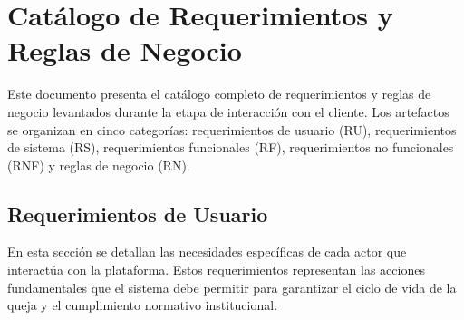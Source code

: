 \documentclass[12pt, oneside, letterpaper]{book}
\begin{document}
\section{Catálogo de Requerimientos y Reglas de Negocio}

Este documento presenta el catálogo completo de requerimientos y reglas de negocio
levantados durante la etapa de interacción con el cliente. Los artefactos se
organizan en cinco categorías: requerimientos de usuario (RU), requerimientos de
sistema (RS), requerimientos funcionales (RF), requerimientos no funcionales (RNF)
y reglas de negocio (RN).

\subsection{Requerimientos de Usuario}

En esta sección se detallan las necesidades específicas de cada actor que
interactúa con la plataforma. Estos requerimientos representan las acciones
fundamentales que el sistema debe permitir para garantizar el ciclo de vida
de la queja y el cumplimiento normativo institucional.
\end{document}
